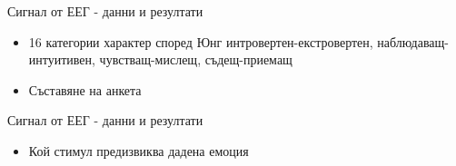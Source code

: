 \documentclass[9pt]{beamer}
\begin{document}
    \begin{frame}[t]{Сигнал от ЕЕГ - данни и резултати}
        \begin{itemize}
            \setlength\itemsep{\fill}
            \pause
            \item 16 категории характер според Юнг
            \pause интровертен-екстровертен, наблюдаващ-интуитивен,
            чувстващ-мислещ, съдещ-приемащ
            \pause
            \item Съставяне на анкета
        \end{itemize}
    \end{frame}

    \begin{frame}[c]{Сигнал от ЕЕГ - данни и резултати}
        \begin{itemize}
            \item Кой стимул предизвиква дадена емоция
        \end{itemize}        
        \pause
        \begin{figure}[H]
        \centering
            \hfill
            \qquad
            \qquad
\end{figure}
\end{frame}
\end{document}
